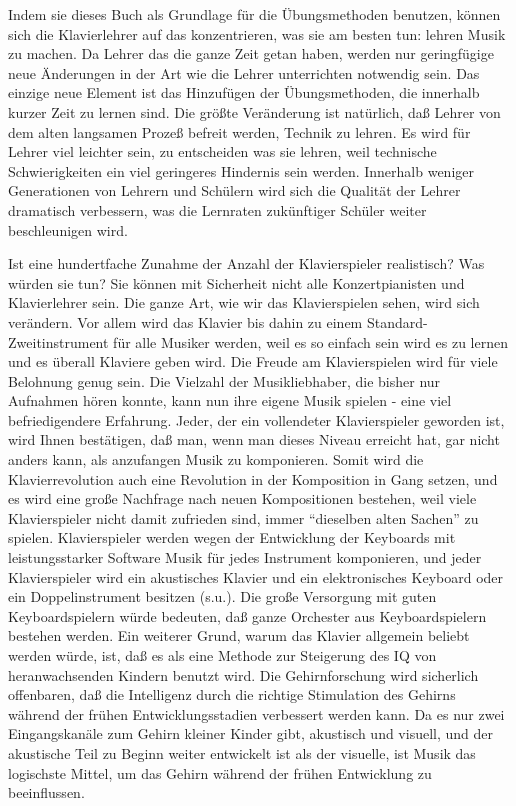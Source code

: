 Indem sie dieses Buch als Grundlage für die Übungsmethoden benutzen, können sich die Klavierlehrer auf das konzentrieren, was sie am besten tun: lehren Musik zu machen.
Da Lehrer das die ganze Zeit getan haben, werden nur geringfügige neue Änderungen in der Art wie die Lehrer unterrichten notwendig sein.
Das einzige neue Element ist das Hinzufügen der Übungsmethoden, die innerhalb kurzer Zeit zu lernen sind.
Die größte Veränderung ist natürlich, daß Lehrer von dem alten langsamen Prozeß befreit werden, Technik zu lehren.
Es wird für Lehrer viel leichter sein, zu entscheiden was sie lehren, weil technische Schwierigkeiten ein viel geringeres Hindernis sein werden.
Innerhalb weniger Generationen von Lehrern und Schülern wird sich die Qualität der Lehrer dramatisch verbessern, was die Lernraten zukünftiger Schüler weiter beschleunigen wird.

Ist eine hundertfache Zunahme der Anzahl der Klavierspieler realistisch?
Was würden sie tun?
Sie können mit Sicherheit nicht alle Konzertpianisten und Klavierlehrer sein.
Die ganze Art, wie wir das Klavierspielen sehen, wird sich verändern.
Vor allem wird das Klavier bis dahin zu einem Standard-Zweitinstrument für alle Musiker werden, weil es so einfach sein wird es zu lernen und es überall Klaviere geben wird.
Die Freude am Klavierspielen wird für viele Belohnung genug sein.
Die Vielzahl der Musikliebhaber, die bisher nur Aufnahmen hören konnte, kann nun ihre eigene Musik spielen - eine viel befriedigendere Erfahrung.
Jeder, der ein vollendeter Klavierspieler geworden ist, wird Ihnen bestätigen, daß man, wenn man dieses Niveau erreicht hat, gar nicht anders kann, als anzufangen Musik zu komponieren.
Somit wird die Klavierrevolution auch eine Revolution in der Komposition in Gang setzen, und es wird eine große Nachfrage nach neuen Kompositionen bestehen, weil viele Klavierspieler nicht damit zufrieden sind, immer \enquote{dieselben alten Sachen} zu spielen.
Klavierspieler werden wegen der Entwicklung der Keyboards mit leistungsstarker Software Musik für jedes Instrument komponieren, und jeder Klavierspieler wird ein akustisches Klavier und ein elektronisches Keyboard oder ein Doppelinstrument besitzen (s.u.).
Die große Versorgung mit guten Keyboardspielern würde bedeuten, daß ganze Orchester aus Keyboardspielern bestehen werden.
Ein weiterer Grund, warum das Klavier allgemein beliebt werden würde, ist, daß es als eine Methode zur Steigerung des IQ von heranwachsenden Kindern benutzt wird.
Die Gehirnforschung wird sicherlich offenbaren, daß die Intelligenz durch die richtige Stimulation des Gehirns während der frühen Entwicklungsstadien verbessert werden kann.
Da es nur zwei Eingangskanäle zum Gehirn kleiner Kinder gibt, akustisch und visuell, und der akustische Teil zu Beginn weiter entwickelt ist als der visuelle, ist Musik das logischste Mittel, um das Gehirn während der frühen Entwicklung zu beeinflussen.

